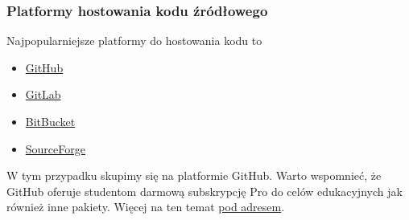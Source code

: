\subsubsection{Platformy hostowania kodu źródłowego}
Najpopularniejsze platformy do hostowania kodu to
\begin{itemize}
  \item \href{https://github.com/}{GitHub}
  \item \href{https://about.gitlab.com/}{GitLab}
  \item \href{https://bitbucket.org/product}{BitBucket}
  \item \href{https://sourceforge.net/}{SourceForge}
\end{itemize}

W tym przypadku skupimy się na platformie GitHub. Warto wspomnieć, że GitHub oferuje studentom darmową subskrypcję Pro do celów edukacyjnych jak również inne pakiety. Więcej na ten temat \href{https://education.github.com/students}{pod adresem}.
